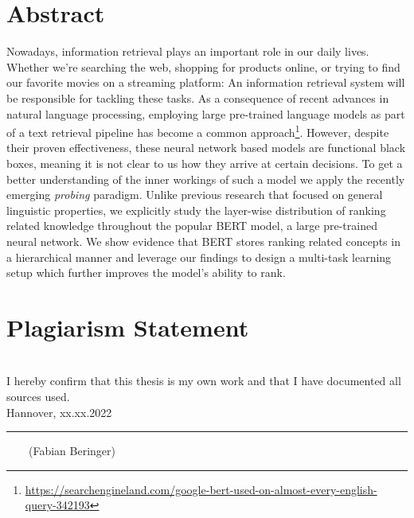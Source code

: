 \documentclass[headsepline]{scrreprt}
\newcommand{\handindate}{xx.xx.2022}
\newcommand{\ti}[1]{\textit{#1}}
\begin{document}


\chapter*{Abstract}
Nowadays, information retrieval plays an important role in our daily lives. Whether we're searching the web, shopping for products online, or trying to find our favorite movies on a streaming platform: An information retrieval system will be responsible for tackling these tasks. As a consequence of recent advances in natural language processing, employing large pre-trained language models as part of a text retrieval pipeline has become a common approach\footnote{\url{https://searchengineland.com/google-bert-used-on-almost-every-english-query-342193}}. However, despite their proven effectiveness, these neural network based models are functional black boxes, meaning it is not clear to us how they arrive at certain decisions. To get a better understanding of the inner workings of such a model we apply the recently emerging \ti{probing} paradigm. Unlike previous research that focused on general linguistic properties, we explicitly study the layer-wise distribution of ranking related knowledge throughout the popular BERT model, a large pre-trained neural network. We show evidence that BERT stores ranking related concepts in a hierarchical manner and leverage our findings to design a multi-task learning setup which further improves the model's ability to rank.

\tableofcontents










\chapter*{Plagiarism Statement}
\vfill
\mbox{} \\
{\large I hereby confirm that this thesis is my own work and that I have documented all sources used.}
\newline
\mbox{} \\
Hannover, \handindate \\
\vspace{4cm}
\hrule
\vspace{0.5cm}
$\qquad$(Fabian Beringer)

\listoffigures
{}
\listoftables
{}
\clearpage
{}
{}
\printbibliography
\end{document}
